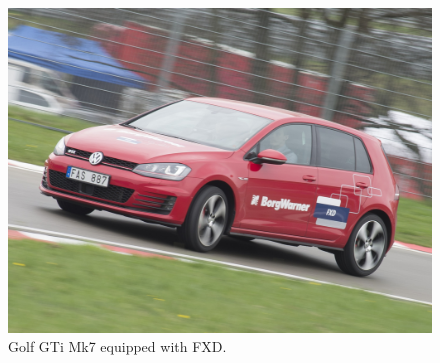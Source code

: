 \begin{figure}[h]
	\centering
	\includegraphics[width=1\textwidth]{Pictures/golf}
	\caption {Golf GTi Mk7 equipped with FXD.}
	\label{golf}
\end{figure}
